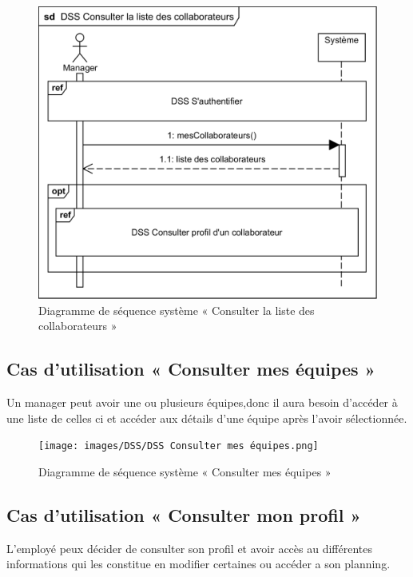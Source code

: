         \begin{figure}[h!]
             \centering
            \includegraphics[scale=0.8]{images/DSS/DSS Consulter la liste des collaborateurs.png}
             \caption{Diagramme de séquence système « Consulter la liste des collaborateurs »}
             \label{fig4}
        \end{figure}
    
    \subsection*{Cas d'utilisation « Consulter mes équipes »}
    Un manager peut avoir une ou  plusieurs équipes,donc il aura besoin d'accéder à une liste de celles ci et accéder aux détails d'une équipe après l'avoir sélectionnée. 
        \begin{figure}[h!]
             \centering
            \texttt{[image: images/DSS/DSS Consulter mes équipes.png]}
             \caption{Diagramme de séquence système « Consulter mes équipes »}
             \label{fig4}
        \end{figure}
        \clearpage
        


    \subsection*{Cas d'utilisation « Consulter mon profil »}
    L'employé peux décider de consulter son profil et avoir accès au différentes informations qui les constitue en modifier certaines ou accéder a son planning. 
     
